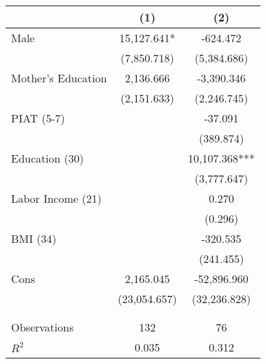 \begin{tabular}{lcc} \toprule
 & (1) & (2) \\ \midrule
Male & 15,127.641* & -624.472 \\
 & (7,850.718) & (5,384.686) \\
Mother's Education & 2,136.666 & -3,390.346 \\
 & (2,151.633) & (2,246.745) \\
PIAT (5-7) &  & -37.091 \\
 &  & (389.874) \\
Education (30) &  & 10,107.368*** \\
 &  & (3,777.647) \\
Labor Income (21) &  & 0.270 \\
 &  & (0.296) \\
BMI (34) &  & -320.535 \\
 &  & (241.455) \\
Cons & 2,165.045 & -52,896.960 \\
 & (23,054.657) & (32,236.828) \\
 &  &  \\ \\ \midrule
Observations & 132 & 76 \\
$R^2$ & 0.035 & 0.312 \\ \bottomrule
\end{tabular}

